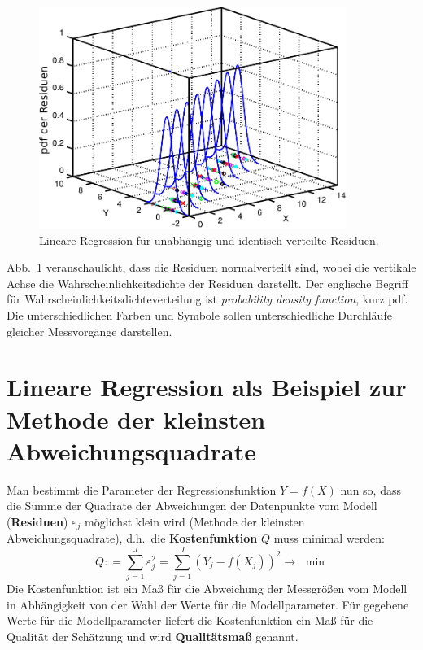 \begin{figure}
	\begin{center}
		\includegraphics[width=100mm]{02_vorlesung/media/regressionNormalResi_1b.pdf}
		\caption{\label{regressionNormalResi} Lineare Regression für unabhängig und
			identisch verteilte Residuen.}
	\end{center}
\end{figure}

Abb.~\ref{regressionNormalResi} veranschaulicht, dass die Residuen normalverteilt sind, wobei die vertikale Achse die Wahrscheinlichkeitsdichte der Residuen darstellt. Der englische Begriff für Wahr\-schein\-lich\-keits\-dichte\-ver\-teil\-ung ist \textsl{probability density function}, kurz pdf. Die unterschiedlichen
Farben und Symbole sollen unterschiedliche Durchläufe gleicher Messvorgänge darstellen.

\section{Lineare Regression als Beispiel zur Methode der kleinsten Abweichungsquadrate}
Man bestimmt die Parameter der Regressionsfunktion $Y =
f(X)$ nun so, dass die Summe der Quadrate der
Abweichungen der Datenpunkte vom Modell (\textbf{Residuen}) $\varepsilon_j $ möglichst klein wird
(Methode der kleinsten Abweichungsquadrate),
d.h.\ die \textbf{Kostenfunktion} $Q$ muss minimal werden:
\begin{equation}
Q: = \sum\limits_{j = 1}^J {\varepsilon_j ^2 = } \sum\limits_{j = 1}^J {(Y_j
	- f(X_j ))^2 \to } \,\,\min
\label{eq:Minimimierung-kleinster-Fehlerquadrate}
\end{equation}
Die Kostenfunktion ist ein Maß für die Abweichung der Messgrößen vom Modell in Abhängigkeit von der
Wahl der Werte für die Modellparameter. Für gegebene Werte für die Modellparameter liefert die
Kostenfunktion ein Maß für die Qualität der Schätzung und wird \textbf{Qualitätsmaß} genannt.

